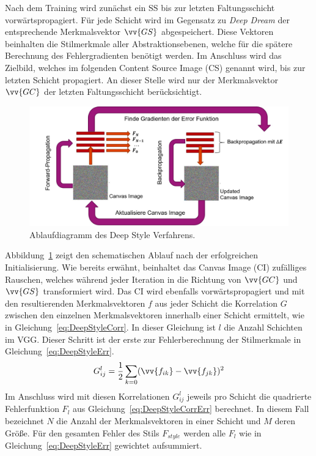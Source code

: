 \documentclass[times, 11pt,twocolumn]{article}
\begin{document}
Nach dem Training wird zunächst ein SS bis zur letzten Faltungsschicht vorwärtspropagiert. Für jede Schicht wird im Gegensatz zu \textit{Deep Dream} der entsprechende Merkmalsvektor $\vv{GS}$ abgespeichert. Diese Vektoren beinhalten die Stilmerkmale aller Abstraktionsebenen, welche für die spätere Berechnung des Fehlergradienten benötigt werden. Im Anschluss wird das Zielbild, welches im folgenden Content Source Image (CS) genannt wird, bis zur letzten Schicht propagiert. An dieser Stelle wird nur der Merkmalsvektor $\vv{GC}$ der letzten Faltungsschicht berücksichtigt.

\begin{figure}
	\flushleft
	\includegraphics[width=\columnwidth]{Bilder/DeepStyle.jpg}
	\caption{Ablaufdiagramm des Deep Style Verfahrens.}
	\label{fig:DeepStyle}
\end{figure}
Abbildung~\ref{fig:DeepStyle} zeigt den schematischen Ablauf nach der erfolgreichen Initialisierung. Wie bereits erwähnt, beinhaltet das Canvas Image (CI) zufälliges Rauschen, welches während jeder Iteration in die Richtung von $\vv{GC}$ und $\vv{GS}$ transformiert wird. Das CI wird ebenfalls vorwärtspropagiert und mit den resultierenden Merkmalsvektoren $f$ aus jeder Schicht die Korrelation $G$ zwischen den einzelnen Merkmalsvektoren innerhalb einer Schicht ermittelt, wie in Gleichung~\ref{eq:DeepStyleCorr}. In dieser Gleichung ist $l$ die Anzahl Schichten im VGG. Dieser Schritt ist der erste zur Fehlerberechnung der Stilmerkmale in Gleichung~\ref{eq:DeepStyleErr}.
\footnotesize
\begin{equation}
G_{ij}^l= \frac{1}{2}\sum_{k=0} (\vv{f_{ik}}- \vv{f_{jk}})^2
\label{eq:DeepStyleCorr}
\end{equation}
\small
Im Anschluss wird mit diesen Korrelationen $G_{ij}^l$ jeweils pro Schicht die quadrierte Fehlerfunktion $F_l$ aus Gleichung~\ref{eq:DeepStyleCorrErr} berechnet. In diesem Fall bezeichnet $N$ die Anzahl der Merkmalsvektoren in einer Schicht und $M$ deren Größe. Für den gesamten Fehler des Stils $F_{style}$ werden alle $F_l$ wie in Gleichung~\ref{eq:DeepStyleErr} gewichtet aufsummiert.
\end{document}

